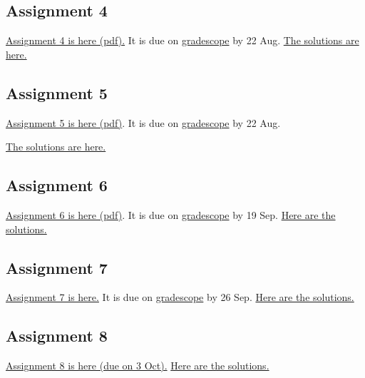 \documentclass{amsart}
\begin{document}
\subsection{Assignment 4}
\label{sec:org430e7d1}
\href{https://canvas.anu.edu.au/files/745075/download?download\_frd=1\&verifier=RGvc4NJGOQv5JgYcvHk2vQL4gBt475FgvOPC1T86}{Assignment 4 is here (pdf).} It is due on \href{https://www.gradescope.com/courses/1070433}{gradescope} by 22 Aug.
\href{https://canvas.anu.edu.au/files/791417/download?download\_frd=1\&verifier=48I1gzK1PZ7G2uqtnL4tpv3JqCcQiB0R7grdJVOq}{The solutions are here.} 
\subsection{Assignment 5}
\label{sec:org4b76469}
\href{https://canvas.anu.edu.au/files/766550/download?download\_frd=1\&verifier=hIrzRPTCuNXvHSfwvI9Pyqb769uPvMQN6TPHyyed}{Assignment 5 is here (pdf)}. It is due on \href{https://www.gradescope.com/courses/1070433}{gradescope} by 22 Aug.

\href{https://canvas.anu.edu.au/files/831136/download?download\_frd=1\&verifier=3OFCtsBt88g1sijZ97fUic7wl55HLXVyKEG9KiNb}{The solutions are here.}
\subsection{Assignment 6}
\label{sec:orga2a53d9}
\href{https://canvas.anu.edu.au/files/816336/download?download\_frd=1\&verifier=zzO377BXRRhK7pRZ1ryBWSLsvrt6pyxFieDq0Fei}{Assignment 6 is here (pdf)}. It is due on \href{https://www.gradescope.com/courses/1070433}{gradescope} by 19 Sep.
\href{https://canvas.anu.edu.au/files/857925/download?download\_frd=1\&verifier=pS5pqwHGJ8bEWXihZQFLBbNR6dWOvHxymFtUu8Ef}{Here are the solutions.}
\subsection{Assignment 7}
\label{sec:org8e93ef5}
\href{https://canvas.anu.edu.au/files/834038/download?download\_frd=1\&verifier=JcJGFhWwQc4AQNBk6Jbx5TWzMAwycfvJ73hlBjf1}{Assignment 7 is here.} It is due on \href{https://www.gradescope.com/courses/1070433}{gradescope} by 26 Sep.
\href{https://canvas.anu.edu.au/files/873289/download?download\_frd=1\&verifier=CiRDUJ25oOKKYlATOalkFwXfUlvsz7FdF1KvA0TY}{Here are the solutions.}
\subsection{Assignment 8}
\label{sec:orga02d6c0}
\href{https://canvas.anu.edu.au/files/848684/download?download\_frd=1\&verifier=mymSd69dVwC8VI9x0UjiFBuxZkzTjXq6VHIRLYwS}{Assignment 8 is here (due on 3 Oct).}
\href{https://canvas.anu.edu.au/files/1253165/download?download\_frd=1\&verifier=yXDhEeO2kLNoAPavhKYi1JAERQ4nWDYoi4iNuEj2}{Here are the solutions.}
\end{document}
